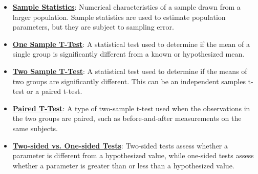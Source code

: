 \documentclass{article}%
\begin{document}
\begin{itemize}[leftmargin=*]
\item \href{https://purdue.brightspace.com/d2l/common/assets/pdfjs-d2l-dist/1.0.14-legacy/web/viewer.html?file=\%2Fcontent\%2Fenforced\%2F1095465-WL.202510.CS24200.LE1\%2F13L2-hypothesis.pdf\%3Fou\%3D1095465\&lang=en-us\&container=d2l-fileviewer-rendered-pdf\&fullscreen=d2l-fileviewer-rendered-pdf-dialog\&height=667#page=11}{\textbf{Sample Statistics}}: Numerical characteristics of a sample drawn from a larger population. Sample statistics are used to estimate population parameters, but they are subject to sampling error.%
\item \href{https://purdue.brightspace.com/d2l/common/assets/pdfjs-d2l-dist/1.0.14-legacy/web/viewer.html?file=\%2Fcontent\%2Fenforced\%2F1095465-WL.202510.CS24200.LE1\%2F13L2-hypothesis.pdf\%3Fou\%3D1095465\&lang=en-us\&container=d2l-fileviewer-rendered-pdf\&fullscreen=d2l-fileviewer-rendered-pdf-dialog\&height=667#page=25}{\textbf{One Sample T-Test}}: A statistical test used to determine if the mean of a single group is significantly different from a known or hypothesized mean.%
\item \href{https://purdue.brightspace.com/d2l/common/assets/pdfjs-d2l-dist/1.0.14-legacy/web/viewer.html?file=\%2Fcontent\%2Fenforced\%2F1095465-WL.202510.CS24200.LE1\%2F13L2-hypothesis.pdf\%3Fou\%3D1095465\&lang=en-us\&container=d2l-fileviewer-rendered-pdf\&fullscreen=d2l-fileviewer-rendered-pdf-dialog\&height=667#page=25}{\textbf{Two Sample T-Test}}: A statistical test used to determine if the means of two groups are significantly different. This can be an independent samples t-test or a paired t-test.%
\item \href{https://purdue.brightspace.com/d2l/common/assets/pdfjs-d2l-dist/1.0.14-legacy/web/viewer.html?file=\%2Fcontent\%2Fenforced\%2F1095465-WL.202510.CS24200.LE1\%2F13L2-hypothesis.pdf\%3Fou\%3D1095465\&lang=en-us\&container=d2l-fileviewer-rendered-pdf\&fullscreen=d2l-fileviewer-rendered-pdf-dialog\&height=667#page=34}{\textbf{Paired T-Test}}: A type of two-sample t-test used when the observations in the two groups are paired, such as before-and-after measurements on the same subjects.%
\item \href{https://purdue.brightspace.com/d2l/common/assets/pdfjs-d2l-dist/1.0.14-legacy/web/viewer.html?file=\%2Fcontent\%2Fenforced\%2F1095465-WL.202510.CS24200.LE1\%2F13L2-hypothesis.pdf\%3Fou\%3D1095465\&lang=en-us\&container=d2l-fileviewer-rendered-pdf\&fullscreen=d2l-fileviewer-rendered-pdf-dialog\&height=667#page=29}{\textbf{Two-sided vs. One-sided Tests}}: Two-sided tests assess whether a parameter is different from a hypothesized value, while one-sided tests assess whether a parameter is greater than or less than a hypothesized value.%

\end{itemize}
\end{document}
